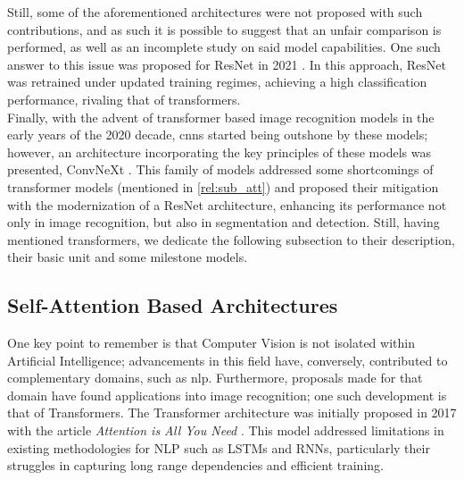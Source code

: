 \noindent Still, some of the aforementioned architectures were not proposed with such 
contributions, and as such it is possible to suggest that an unfair comparison is performed, 
as well as an incomplete study on said model capabilities. One such answer to this issue was 
proposed for ResNet in 2021 \autocite{wightman2021resnet}. In this approach, ResNet was retrained 
under updated training regimes, achieving a high classification performance, rivaling that of 
transformers.\\
\noindent Finally, with the advent of transformer based image recognition models in the early years of the 
2020 decade, \glspl{cnn} started being outshone by these models; however, an architecture 
incorporating the key principles of these models was presented, ConvNeXt \autocite{liu2022convnet}.
This family of models addressed some shortcomings of transformer models (mentioned in 
\autoref{rel:sub_att}) and proposed their mitigation with the modernization of a ResNet 
architecture, enhancing its performance not only in image recognition, but also in segmentation and 
detection. Still, having mentioned transformers, we dedicate the following subsection to their 
description, their basic unit and some milestone models.
\subsection{Self-Attention Based Architectures}
\label{rel:sub_att}
One key point to remember is that Computer Vision is not isolated within Artificial 
Intelligence; advancements in this field have, conversely, contributed to complementary domains, 
such as \gls{nlp}. Furthermore, proposals made for that domain have found applications into image 
recognition; one such development is that of Transformers. The Transformer architecture was 
initially proposed in 2017 with the article \emph{Attention is All You Need} 
\autocite{vaswani2017attention}. This model addressed limitations in existing methodologies for 
NLP such as LSTMs and RNNs, particularly their struggles in capturing long range dependencies 
and efficient training.\\

